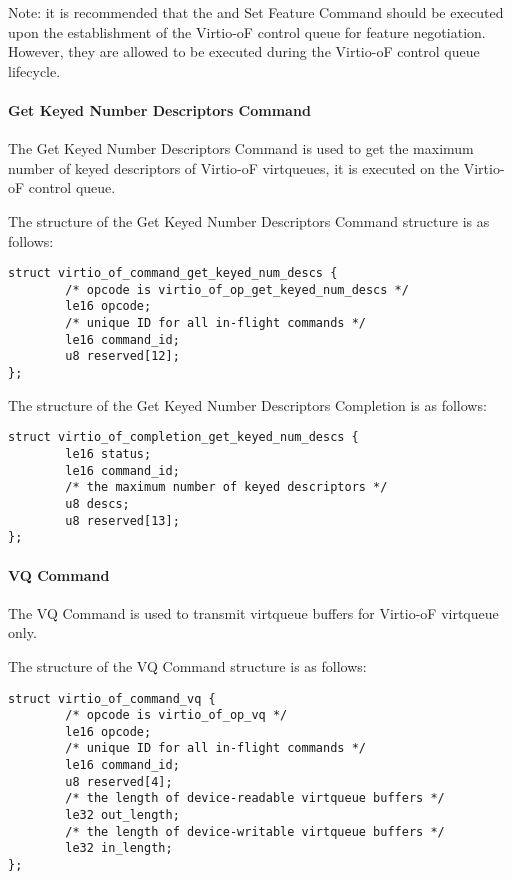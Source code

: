 Note: it is recommended that the
and Set Feature Command should be executed upon the establishment of the Virtio-oF control queue for feature negotiation.
However, they are allowed to be executed during the Virtio-oF control queue lifecycle.

\paragraph{Get Keyed Number Descriptors Command}\label{sec:Virtio Transport Options / Virtio Over Fabrics / Commands Definition / Opcodes / Get Keyed Number Descriptors Command}
The Get Keyed Number Descriptors Command is used to get the maximum number of keyed descriptors of Virtio-oF virtqueues, it is executed on the Virtio-oF control queue.

The structure of the Get Keyed Number Descriptors Command structure is as follows:
\begin{lstlisting}
struct virtio_of_command_get_keyed_num_descs {
        /* opcode is virtio_of_op_get_keyed_num_descs */
        le16 opcode;
        /* unique ID for all in-flight commands */
        le16 command_id;
        u8 reserved[12];
};
\end{lstlisting}

The structure of the Get Keyed Number Descriptors Completion is as follows:
\begin{lstlisting}
struct virtio_of_completion_get_keyed_num_descs {
        le16 status;
        le16 command_id;
        /* the maximum number of keyed descriptors */
        u8 descs;
        u8 reserved[13];
};
\end{lstlisting}

\paragraph{VQ Command}\label{sec:Virtio Transport Options / Virtio Over Fabrics / Commands Definition / Opcodes / VQ Command}
The VQ Command is used to transmit virtqueue buffers for Virtio-oF virtqueue only.

The structure of the VQ Command structure is as follows:
\begin{lstlisting}
struct virtio_of_command_vq {
        /* opcode is virtio_of_op_vq */
        le16 opcode;
        /* unique ID for all in-flight commands */
        le16 command_id;
        u8 reserved[4];
        /* the length of device-readable virtqueue buffers */
        le32 out_length;
        /* the length of device-writable virtqueue buffers */
        le32 in_length;
};
\end{lstlisting}

